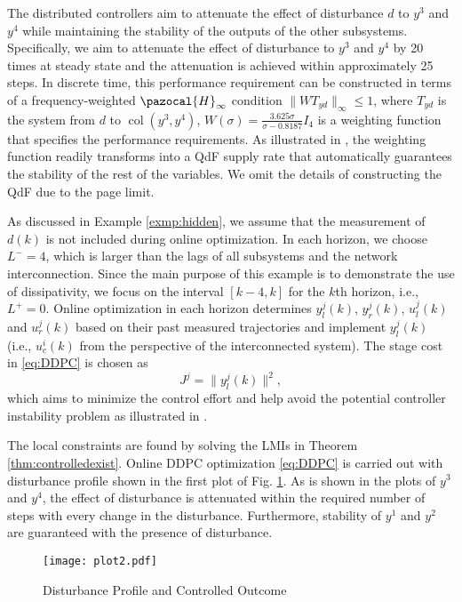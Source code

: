 \documentclass[11pt,print,draftcls,onecolumn,romanappendices]{ieeecolor}
\DeclareMathOperator{\col}{col}
\begin{document}
{The distributed controllers aim to attenuate the effect of disturbance $d$ to $y^3$ and $y^4$ while maintaining the stability of the outputs of the other subsystems. Specifically, we aim to attenuate the effect of disturbance to $y^3$ and $y^4$ by 20 times at steady state and the attenuation is achieved within approximately 25 steps. In discrete time, this performance requirement can be constructed in terms of a frequency-weighted $\pazocal{H}_\infty$ condition $\|WT_{yd}\|_\infty\leq1$, where $T_{yd}$ is the system from $d$ to $\col(y^3,y^4)$, $W(\sigma)=\frac{3.625\sigma}{\sigma-0.8187}I_4$ is a weighting function that specifies the performance requirements. As illustrated in \cite{Yan:2019}, the weighting function readily transforms into a QdF supply rate that automatically guarantees the stability of the rest of the variables. We omit the details of constructing the QdF due to the page limit. 

As discussed in Example \ref{exmp:hidden}, we assume that the measurement of $d(k)$ is not included during online optimization. In each horizon, we choose $L^-=4$, which is larger than the lags of all subsystems and the network interconnection. Since the main purpose of this example is to demonstrate the use of dissipativity, we focus on the interval $[k-4,k]$ for the $k$th horizon, i.e., $L^+=0$. Online optimization in each horizon determines $y_l^j(k)$, $y_r^j(k)$, $u_l^j(k)$ and $u_r^j(k)$ based on their past measured trajectories and implement $y_l^j(k)$ (i.e., $u_c^i(k)$ from the perspective of the interconnected system). The stage cost in \eqref{eq:DDPC} is chosen as
\begin{equation}
    J^j=\|y_l^j(k)\|^2,
\end{equation}
which aims to minimize the control effort and help avoid the potential controller instability problem as illustrated in \cite{Markovsky:2008}.

The local constraints are found by solving the LMIs in Theorem \ref{thm:controlledexist}. Online DDPC optimization \eqref{eq:DDPC} is carried out with disturbance profile shown in the first plot of Fig. \ref{fig:plot}. As is shown in the plots of $y^3$ and $y^4$, the effect of disturbance is attenuated within the required number of steps with every change in the disturbance. Furthermore, stability of $y^1$ and $y^2$ are guaranteed with the presence of disturbance.
\begin{figure}
		\centering
		\texttt{[image: plot2.pdf]}       
		\caption{Disturbance Profile and Controlled Outcome}
		\label{fig:plot}
	\end{figure}}
\end{document}
